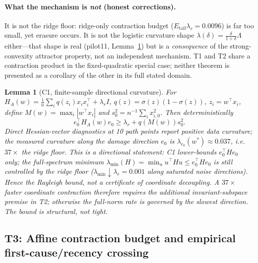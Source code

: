 \documentclass{article}
\newtheorem{lemma}{Lemma}
\begin{document}
\paragraph{What the mechanism is \emph{not} (honest corrections).} It is not the ridge floor:
ridge-only contraction budget ($E_{\mathrm{tail}}\lambda_r=0.0096$) is far too small, yet erasure
occurs. It is not the logistic curvature shape $\lambda(\delta)=\frac{\delta}{1+\delta}\Lambda$
either---that shape is real (pilot11, Lemma~\ref{lem:c1}) but is a \emph{consequence} of the
strong-convexity attractor property, not an independent mechanism. T1 and T2 share a contraction
product in the fixed-quadratic special case; neither theorem is presented as a corollary of the
other in its full stated domain.

\begin{lemma}[C1, finite-sample directional curvature]
\label{lem:c1}
For $H_A(w)=\frac1n\sum_i q(z_i)x_ix_i^\top+\lambda_r I$,
$q(z)=\sigma(z)(1-\sigma(z))$, $z_i=w^\top x_i$, define
$M(w)=\max_i|w^\top x_i|$ and $s_0^2=n^{-1}\sum_i x_{i,0}^2$. Then deterministically
\begin{equation}
e_0^\top H_A(w)e_0\geq\lambda_r+q(M(w))s_0^2.
\label{eq:c1valid}
\end{equation}
Direct Hessian-vector diagnostics at 10 path points report positive data curvature; the measured
curvature \emph{along the damage direction} $e_0$ is
$\lambda_{e_0}(w^*)\approx0.037$, i.e.\ $37\times$ the ridge floor. This is a directional
statement: C1 lower-bounds $e_0^\top H e_0$ only; the full-spectrum minimum
$\lambda_{\min}(H)=\min_u u^\top Hu\le e_0^\top H e_0$ is still controlled by the ridge floor
($\lambda_{\min}\downarrow\lambda_r=0.001$ along saturated noise directions). Hence the
Rayleigh bound, not a certificate of coordinate decoupling. A $37\times$ faster coordinate
contraction therefore requires the additional invariant-subspace premise in T2; otherwise the
full-norm rate is governed by the slowest direction. The bound is structural, not tight.
\end{lemma}

\subsection{T3: Affine contraction budget and empirical first-cause/recency crossing}
\label{sec:t3}
\end{document}
